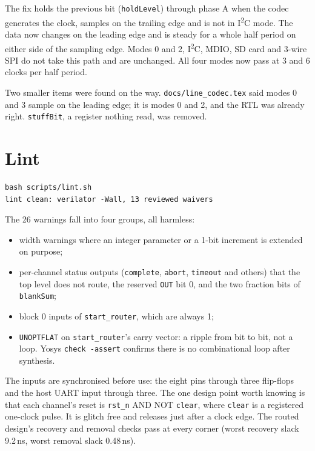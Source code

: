 \documentclass[11pt,a4paper]{article}
\newcommand{\sig}[1]{\texttt{#1}}
\begin{document}
The fix holds the previous bit (\sig{holdLevel}) through phase A when the codec generates the clock, samples on the trailing edge and is not in I\textsuperscript{2}C mode. The data now changes on the leading edge and is steady for a whole half period on either side of the sampling edge. Modes 0 and 2, I\textsuperscript{2}C, MDIO, SD card and 3-wire SPI do not take this path and are unchanged. All four modes now pass at 3 and 6 clocks per half period.

Two smaller items were found on the way. \sig{docs/line\_codec.tex} said modes 0 and 3 sample on the leading edge; it is modes 0 and 2, and the RTL was already right. \sig{stuffBit}, a register nothing read, was removed.

\section{Lint}

\begin{lstlisting}
bash scripts/lint.sh
lint clean: verilator -Wall, 13 reviewed waivers
\end{lstlisting}

The 26 warnings fall into four groups, all harmless:
\begin{itemize}
\item width warnings where an integer parameter or a 1-bit increment is extended on purpose;
\item per-channel status outputs (\sig{complete}, \sig{abort}, \sig{timeout} and others) that the top level does not route, the reserved \sig{OUT} bit 0, and the two fraction bits of \sig{blankSum};
\item block 0 inputs of \sig{start\_router}, which are always 1;
\item \sig{UNOPTFLAT} on \sig{start\_router}'s carry vector: a ripple from bit to bit, not a loop. Yosys \sig{check -assert} confirms there is no combinational loop after synthesis.
\end{itemize}

The inputs are synchronised before use: the eight pins through three flip-flops and the host UART input through three. The one design point worth knowing is that each channel's reset is \sig{rst\_n} AND NOT \sig{clear}, where \sig{clear} is a registered one-clock pulse. It is glitch free and releases just after a clock edge. The routed design's recovery and removal checks pass at every corner (worst recovery slack 9.2\,ns, worst removal slack 0.48\,ns).
\end{document}
